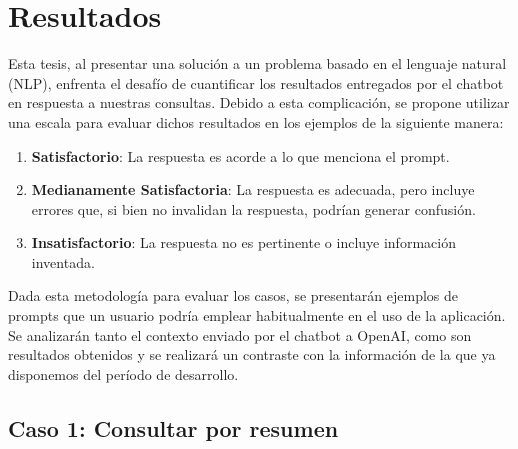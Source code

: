 \chapter{Resultados}

Esta tesis, al presentar una solución a un problema basado en el lenguaje natural (NLP), enfrenta el desafío de cuantificar 
los resultados entregados por el chatbot en respuesta a nuestras consultas. Debido a esta complicación, se propone utilizar 
una escala para evaluar dichos resultados en los ejemplos de la siguiente manera:

\begin{enumerate}
    \item \textbf{Satisfactorio}: La respuesta es acorde a lo que menciona el prompt.
    \item \textbf{Medianamente Satisfactoria}: La respuesta es adecuada, pero incluye errores que, si bien no invalidan la respuesta, podrían generar confusión.
    \item \textbf{Insatisfactorio}: La respuesta no es pertinente o incluye información inventada.
\end{enumerate}

Dada esta metodología para evaluar los casos, se presentarán ejemplos de prompts que un usuario podría emplear habitualmente 
en el uso de la aplicación. Se analizarán tanto el contexto enviado por el chatbot a OpenAI, como son resultados obtenidos y se 
realizará un contraste con la información de la que ya disponemos del período de desarrollo.

\section{Caso 1: Consultar por resumen}


